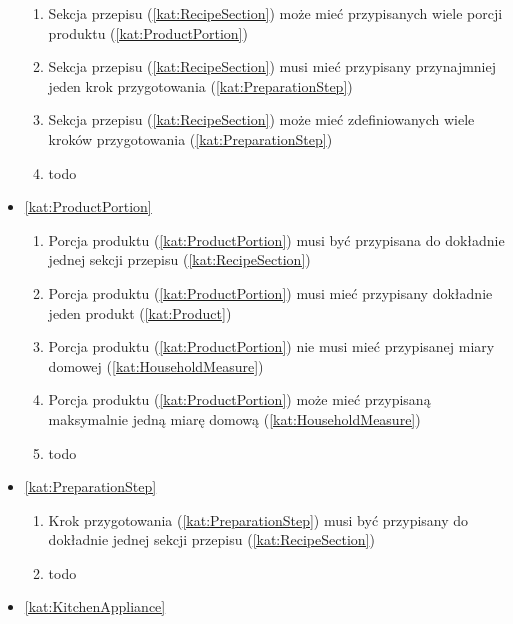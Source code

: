 \begin{itemize}[label={\textbf{Reguły dla}}, wide, labelwidth=!, labelindent=0pt]
\begin{enumerate}[label={\textbf{REG/\protect\threedigits{\arabic{enumi}}}}, wide, labelwidth=!, align=left, leftmargin=3cm, resume]
        \item Sekcja przepisu (\ref{kat:RecipeSection}) może mieć przypisanych wiele porcji produktu (\ref{kat:ProductPortion})
        \item Sekcja przepisu (\ref{kat:RecipeSection}) musi mieć przypisany przynajmniej jeden krok przygotowania (\ref{kat:PreparationStep})
        \item Sekcja przepisu (\ref{kat:RecipeSection}) może mieć zdefiniowanych wiele kroków przygotowania (\ref{kat:PreparationStep})
        \item todo
    \end{enumerate}
    \item\ref{kat:ProductPortion}
    \begin{enumerate}[label={\textbf{REG/\protect\threedigits{\arabic{enumi}}}}, wide, labelwidth=!, align=left, leftmargin=3cm, resume]
        \item Porcja produktu (\ref{kat:ProductPortion}) musi być przypisana do dokładnie jednej sekcji przepisu (\ref{kat:RecipeSection})
        \item Porcja produktu (\ref{kat:ProductPortion}) musi mieć przypisany dokładnie jeden produkt (\ref{kat:Product})
        \item Porcja produktu (\ref{kat:ProductPortion}) nie musi mieć przypisanej miary domowej (\ref{kat:HouseholdMeasure})
        \item Porcja produktu (\ref{kat:ProductPortion}) może mieć przypisaną maksymalnie jedną miarę domową (\ref{kat:HouseholdMeasure})
        \item todo
    \end{enumerate}
    \item\ref{kat:PreparationStep}
    \begin{enumerate}[label={\textbf{REG/\protect\threedigits{\arabic{enumi}}}}, wide, labelwidth=!, align=left, leftmargin=3cm, resume]
        \item Krok przygotowania (\ref{kat:PreparationStep}) musi być przypisany do dokładnie jednej sekcji przepisu (\ref{kat:RecipeSection})
        \item todo
    \end{enumerate}
    \item\ref{kat:KitchenAppliance}
    \begin{enumerate}[label={\textbf{REG/\protect\threedigits{\arabic{enumi}}}}, wide, labelwidth=!, align=left, leftmargin=3cm, resume]

\end{enumerate}
\end{itemize}

